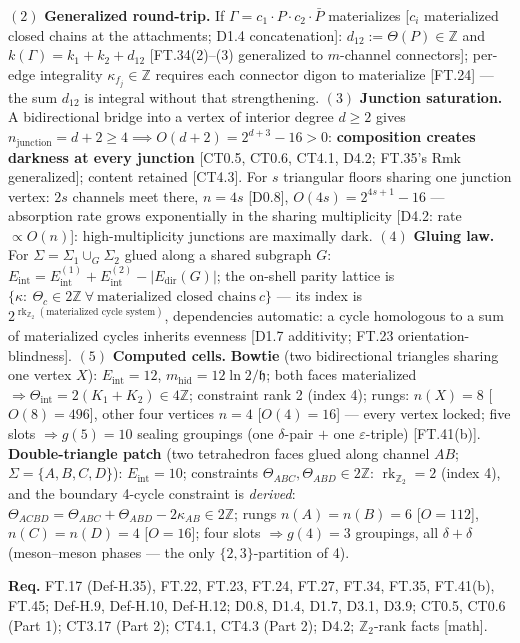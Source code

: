 \begin{theorem}
$(2)$ \textbf{Generalized round-trip.} If $\Gamma=c_1\cdot P\cdot c_2\cdot\bar P$ materializes [$c_i$ materialized closed chains at the attachments; D1.4 concatenation]: $d_{12}:=\Theta(P)\in\mathbb Z$ and $k(\Gamma)=k_1+k_2+d_{12}$ [FT.34(2)–(3) generalized to $m$-channel connectors]; per-edge integrality $\kappa_{f_j}\in\mathbb Z$ requires each connector digon to materialize [FT.24] — the sum $d_{12}$ is integral without that strengthening. $(3)$ \textbf{Junction saturation.} A bidirectional bridge into a vertex of interior degree $d\ge2$ gives $n_{\mathrm{junction}}=d+2\ge4\implies O(d{+}2)=2^{d+3}-16>0$: \textbf{composition creates darkness at every junction} [CT0.5, CT0.6, CT4.1, D4.2; FT.35's Rmk generalized]; content retained [CT4.3]. For $s$ triangular floors sharing one junction vertex: $2s$ channels meet there, $n=4s$ [D0.8], $O(4s)=2^{4s+1}-16$ — absorption rate grows exponentially in the sharing multiplicity [D4.2: rate $\propto O(n)$]: high-multiplicity junctions are maximally dark. $(4)$ \textbf{Gluing law.} For $\Sigma=\Sigma_1\cup_G\Sigma_2$ glued along a shared subgraph $G$: $E_{\mathrm{int}}=E_{\mathrm{int}}^{(1)}+E_{\mathrm{int}}^{(2)}-|E_{\mathrm{dir}}(G)|$; the on-shell parity lattice is $\{\kappa:\ \Theta_c\in2\mathbb Z\ \forall\ \text{materialized closed chains}\ c\}$ — its index is $2^{\operatorname{rk}_{\mathbb Z_2}(\text{materialized cycle system})}$, dependencies automatic: a cycle homologous to a sum of materialized cycles inherits evenness [D1.7 additivity; FT.23 orientation-blindness]. $(5)$ \textbf{Computed cells.} \textbf{Bowtie} (two bidirectional triangles sharing one vertex $X$): $E_{\mathrm{int}}=12$, $m_{\mathrm{hid}}=12\ln2/\mathfrak h$; both faces materialized $\Rightarrow\Theta_{\mathrm{int}}=2(K_1{+}K_2)\in4\mathbb Z$; constraint rank 2 (index 4); rungs: $n(X)=8$ [$O(8)=496$], other four vertices $n=4$ [$O(4)=16$] — every vertex locked; five slots $\Rightarrow g(5)=10$ sealing groupings (one $\delta$-pair $+$ one $\varepsilon$-triple) [FT.41(b)]. \textbf{Double-triangle patch} (two tetrahedron faces glued along channel $AB$; $\Sigma=\{A,B,C,D\}$): $E_{\mathrm{int}}=10$; constraints $\Theta_{ABC},\Theta_{ABD}\in2\mathbb Z$: $\operatorname{rk}_{\mathbb Z_2}=2$ (index 4), and the boundary 4-cycle constraint is \textit{derived}: $\Theta_{ACBD}=\Theta_{ABC}+\Theta_{ABD}-2\kappa_{AB}\in2\mathbb Z$; rungs $n(A)=n(B)=6$ [$O=112$], $n(C)=n(D)=4$ [$O=16$]; four slots $\Rightarrow g(4)=3$ groupings, all $\delta{+}\delta$ (meson–meson phases — the only $\{2,3\}$-partition of 4).

\textbf{Req.} FT.17 (Def-H.35), FT.22, FT.23, FT.24, FT.27, FT.34, FT.35, FT.41(b), FT.45; Def-H.9, Def-H.10, Def-H.12; D0.8, D1.4, D1.7, D3.1, D3.9; CT0.5, CT0.6 (Part 1); CT3.17 (Part 2); CT4.1, CT4.3 (Part 2); D4.2; $\mathbb Z_2$-rank facts [math].


\end{theorem}
